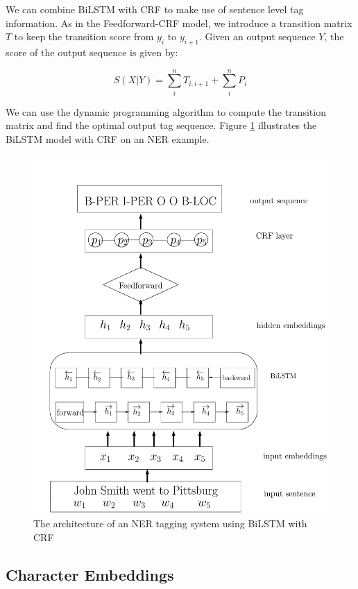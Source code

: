  We can combine BiLSTM with CRF to make use of sentence level tag information. As in the Feedforward-CRF model, we introduce a transition matrix $T$ to keep the transition score from $y_{i}$ to $y_{i+1}$. Given an output sequence $Y$, the score of the output sequence is given by:

\begin{equation}
S\left( X|Y\right)=\sum _{i}^{n}T_{i,i+1}+\sum _{i}^{n}P_{i}
\end{equation}

We can use the dynamic programming algorithm to compute the transition matrix and find the optimal output tag sequence. Figure \ref{fig:bilstmcrf} illustrates the BiLSTM model with CRF on an NER example.

\begin{figure}
  \centering
  \includegraphics[scale=0.6]{bilstmcrf.pdf}
 \caption{The architecture of an NER tagging system using BiLSTM with CRF}
  \label{fig:bilstmcrf}
\end{figure}

\subsection{Character Embeddings}

